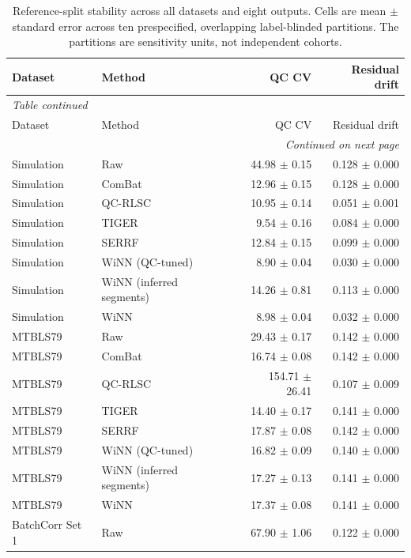 \scriptsize
\begin{longtable}{llrr}
\caption{Reference-split stability across all datasets and eight outputs. Cells are mean $\pm$ standard error across ten prespecified, overlapping label-blinded partitions. The partitions are sensitivity units, not independent cohorts.}\label{tab:supp_reference_splits}\\
\toprule
Dataset & Method & QC CV & Residual drift \\
\midrule
\endfirsthead
\multicolumn{4}{l}{\textit{Table \thetable{} continued}}\\
\toprule
Dataset & Method & QC CV & Residual drift \\
\midrule
\endhead
\midrule
\multicolumn{4}{r}{\textit{Continued on next page}}\\
\endfoot
\bottomrule
\endlastfoot
Simulation & Raw & 44.98 $\pm$ 0.15 & 0.128 $\pm$ 0.000 \\
Simulation & ComBat & 12.96 $\pm$ 0.15 & 0.128 $\pm$ 0.000 \\
Simulation & QC-RLSC & 10.95 $\pm$ 0.14 & 0.051 $\pm$ 0.001 \\
Simulation & TIGER & 9.54 $\pm$ 0.16 & 0.084 $\pm$ 0.000 \\
Simulation & SERRF & 12.84 $\pm$ 0.15 & 0.099 $\pm$ 0.000 \\
Simulation & WiNN (QC-tuned) & 8.90 $\pm$ 0.04 & 0.030 $\pm$ 0.000 \\
Simulation & WiNN (inferred segments) & 14.26 $\pm$ 0.81 & 0.113 $\pm$ 0.000 \\
Simulation & WiNN & 8.98 $\pm$ 0.04 & 0.032 $\pm$ 0.000 \\
MTBLS79 & Raw & 29.43 $\pm$ 0.17 & 0.142 $\pm$ 0.000 \\
MTBLS79 & ComBat & 16.74 $\pm$ 0.08 & 0.142 $\pm$ 0.000 \\
MTBLS79 & QC-RLSC & 154.71 $\pm$ 26.41 & 0.107 $\pm$ 0.009 \\
MTBLS79 & TIGER & 14.40 $\pm$ 0.17 & 0.141 $\pm$ 0.000 \\
MTBLS79 & SERRF & 17.87 $\pm$ 0.08 & 0.142 $\pm$ 0.000 \\
MTBLS79 & WiNN (QC-tuned) & 16.82 $\pm$ 0.09 & 0.140 $\pm$ 0.000 \\
MTBLS79 & WiNN (inferred segments) & 17.27 $\pm$ 0.13 & 0.141 $\pm$ 0.000 \\
MTBLS79 & WiNN & 17.37 $\pm$ 0.08 & 0.141 $\pm$ 0.000 \\
BatchCorr Set 1 & Raw & 67.90 $\pm$ 1.06 & 0.122 $\pm$ 0.000 \\

\end{longtable}
